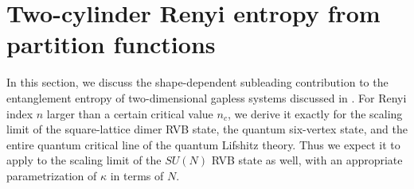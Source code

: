 \documentclass[11pt]{iopart}
\begin{document}




\section{Two-cylinder Renyi entropy from partition functions}
\label{sec:shape_general}
In this section, we discuss the shape-dependent subleading contribution to the entanglement entropy 
of two-dimensional gapless systems discussed in \cite{Ju2012}. For Renyi index $n$ larger than a certain critical value $n_c$, we derive it exactly for the scaling limit of the square-lattice dimer RVB state, the quantum six-vertex state, and the entire quantum critical line of the quantum Lifshitz theory. Thus we expect it to apply to the scaling limit of the $SU(N)$ RVB state as well, with an appropriate parametrization of $\kappa$ in terms of $N$.
\end{document}
